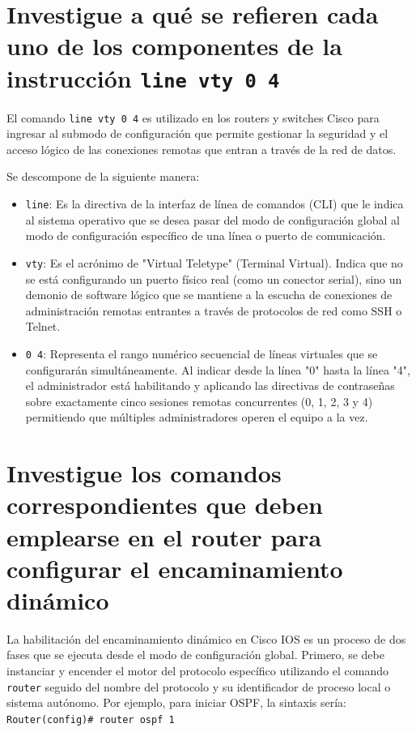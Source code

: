 \documentclass[a4paper,12pt]{article}
\begin{document}
\section{Investigue a qué se refieren cada uno de los componentes de la instrucción \texttt{line vty 0 4}}

El comando \texttt{line vty 0 4} es utilizado en los routers y switches Cisco para ingresar al submodo de configuración que permite gestionar la seguridad y el acceso lógico de las conexiones remotas que entran a través de la red de datos.

Se descompone de la siguiente manera:
\begin{itemize}
\item \texttt{line}: Es la directiva de la interfaz de línea de comandos (CLI) que le indica al sistema operativo que se desea pasar del modo de configuración global al modo de configuración específico de una línea o puerto de comunicación.
\item \texttt{vty}: Es el acrónimo de "Virtual Teletype" (Terminal Virtual). Indica que no se está configurando un puerto físico real (como un conector serial), sino un demonio de software lógico que se mantiene a la escucha de conexiones de administración remotas entrantes a través de protocolos de red como SSH o Telnet.
\item \texttt{0 4}: Representa el rango numérico secuencial de líneas virtuales que se configurarán simultáneamente. Al indicar desde la línea "0" hasta la línea "4", el administrador está habilitando y aplicando las directivas de contraseñas sobre exactamente cinco sesiones remotas concurrentes (0, 1, 2, 3 y 4) permitiendo que múltiples administradores operen el equipo a la vez.
\end{itemize}

\section{Investigue los comandos correspondientes que deben emplearse en el router para configurar el encaminamiento dinámico}

La habilitación del encaminamiento dinámico en Cisco IOS es un proceso de dos fases que se ejecuta desde el modo de configuración global. Primero, se debe instanciar y encender el motor del protocolo específico utilizando el comando \texttt{router} seguido del nombre del protocolo y su identificador de proceso local o sistema autónomo. Por ejemplo, para iniciar OSPF, la sintaxis sería:
\texttt{Router(config)\# router ospf 1}
\end{document}
